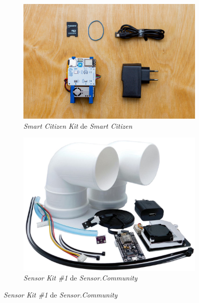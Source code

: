 \begin{figure}[h]
    \centering
    \caption{Os \textit{kits} de \textit{Smart Citizen} e \textit{Sensor.Community}}
    \begin{subfigure}{0.54\textwidth}
        \includegraphics[width=\textwidth]{chapters/1-MONITORAMENTO/Figuras/smart-citizen-kit.jpg}
        \caption{\textit{Smart Citizen Kit} de \textit{Smart Citizen}}
        \label{fig:smart-citizen-kit}
    \end{subfigure}
    \hfill
    \begin{subfigure}{0.45\textwidth}
        \includegraphics[width=\textwidth]{chapters/1-MONITORAMENTO/Figuras/sensor-community-kit.jpg}
        \caption{\textit{Sensor Kit \#1} de \textit{Sensor.Community}}
        \label{fig:sensor-community-kit}
    \end{subfigure}
    \hfill
\end{figure}

